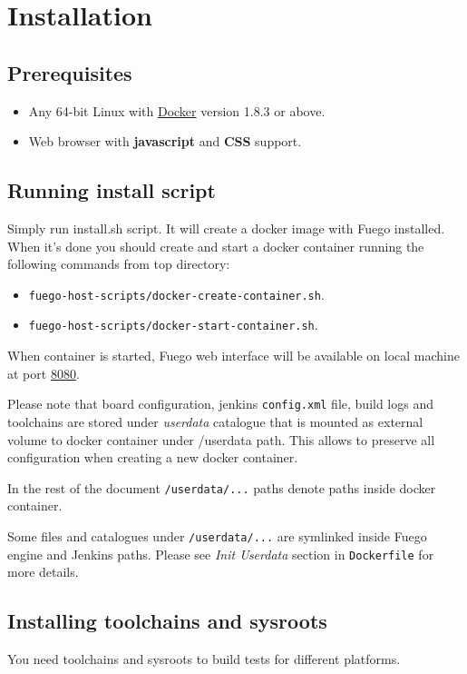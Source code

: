 \section{Installation}
\label{sec:install}

\subsection{Prerequisites}
\label{sec:prereq}

\begin{itemize}
\item Any 64-bit Linux with \href{https://www.docker.com/}{Docker} version 1.8.3 or above.
\item Web browser with \textbf{javascript} and \textbf{CSS} support.
\end{itemize}
\subsection{Running install script}
\label{sec:inst-steps}

Simply run install.sh script. It will create a docker image with Fuego installed. When it's done you should create and start a docker container running the following commands from top directory: 
\begin{itemize}
\item \texttt{fuego-host-scripts/docker-create-container.sh}.
\item \texttt{fuego-host-scripts/docker-start-container.sh}.
\end{itemize}

When container is started, Fuego web interface will be available on local machine at port \href{http://localhost:8080}{8080}.

Please note that board configuration, jenkins \texttt{config.xml} file, build logs and toolchains are stored under \textit{userdata} catalogue that is mounted as external volume to docker container under /userdata path. This allows to preserve all configuration when creating a new docker container. 

In the rest of the document \texttt{/userdata/...} paths denote paths inside docker container.

Some files and catalogues under \texttt{/userdata/...} are symlinked inside Fuego engine and Jenkins paths. Please see \textit{Init Userdata} section in \texttt{Dockerfile} for more details.

\subsection{Installing toolchains and sysroots}
You need toolchains and sysroots to build tests for different platforms. 
\label{sec:toolchain-install}
